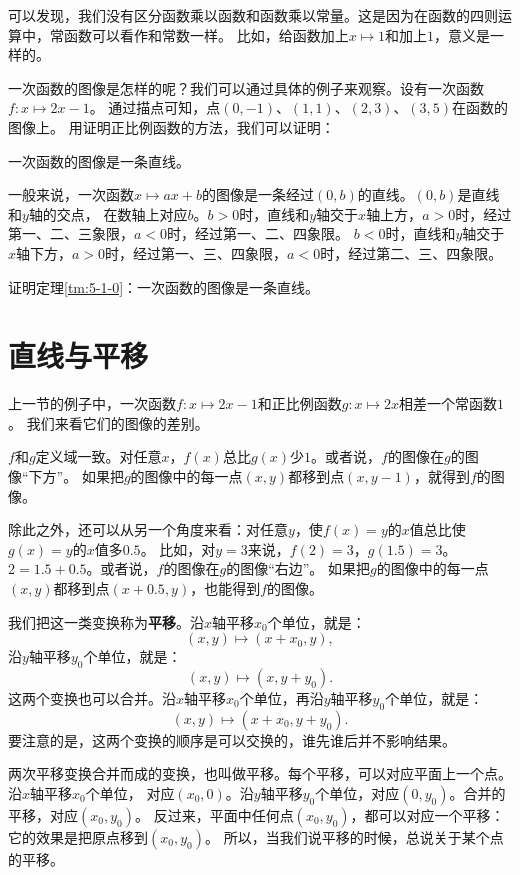 \documentclass[12pt,UTF8]{ctexbook}
\begin{document}
可以发现，我们没有区分函数乘以函数和函数乘以常量。这是因为在函数的四则运算中，常函数可以看作和常数一样。
比如，给函数加上$x\mapsto 1$和加上$1$，意义是一样的。

一次函数的图像是怎样的呢？我们可以通过具体的例子来观察。设有一次函数$f: x\mapsto 2x - 1$。
通过描点可知，点$(0, -1)$、$(1, 1)$、$(2, 3)$、$(3, 5)$在函数的图像上。
用证明正比例函数的方法，我们可以证明：

\begin{tm}\label{tm:5-1-0}
    一次函数的图像是一条直线。
\end{tm}

一般来说，一次函数$x\mapsto ax + b$的图像是一条经过$(0, b)$的直线。$(0, b)$是直线和$y$轴的交点，
在数轴上对应$b$。$b>0$时，直线和$y$轴交于$x$轴上方，$a>0$时，经过第一、二、三象限，$a<0$时，经过第一、二、四象限。
$b<0$时，直线和$y$轴交于$x$轴下方，$a>0$时，经过第一、三、四象限，$a<0$时，经过第二、三、四象限。

\begin{xt}
    证明定理\ref{tm:5-1-0}：一次函数的图像是一条直线。
\end{xt}

\section{直线与平移}
上一节的例子中，一次函数$f: x\mapsto 2x - 1$和正比例函数$g: x\mapsto 2x$相差一个常函数$1$。
我们来看它们的图像的差别。

$f$和$g$定义域一致。对任意$x$，$f(x)$总比$g(x)$少$1$。或者说，$f$的图像在$g$的图像“下方”。
如果把$g$的图像中的每一点$(x, y)$都移到点$(x, y-1)$，就得到$f$的图像。

除此之外，还可以从另一个角度来看：对任意$y$，使$f(x)=y$的$x$值总比使$g(x)=y$的$x$值多$0.5$。
比如，对$y=3$来说，$f(2)=3$，$g(1.5)=3$。$2=1.5+0.5$。或者说，$f$的图像在$g$的图像“右边”。
如果把$g$的图像中的每一点$(x, y)$都移到点$(x+0.5, y)$，也能得到$f$的图像。

我们把这一类变换称为\textbf{平移}。沿$x$轴平移$x_0$个单位，就是：
$$ (x, y) \mapsto (x+x_0, y),$$
沿$y$轴平移$y_0$个单位，就是：
$$ (x, y) \mapsto (x, y+y_0).$$
这两个变换也可以合并。沿$x$轴平移$x_0$个单位，再沿$y$轴平移$y_0$个单位，就是：
$$ (x, y) \mapsto (x+x_0, y+y_0).$$
要注意的是，这两个变换的顺序是可以交换的，谁先谁后并不影响结果。

两次平移变换合并而成的变换，也叫做平移。每个平移，可以对应平面上一个点。沿$x$轴平移$x_0$个单位，
对应$(x_0, 0)$。沿$y$轴平移$y_0$个单位，对应$(0, y_0)$。合并的平移，对应$(x_0, y_0)$。
反过来，平面中任何点$(x_0, y_0)$，都可以对应一个平移：它的效果是把原点移到$(x_0, y_0)$。
所以，当我们说平移的时候，总说关于某个点的平移。
\end{document}
